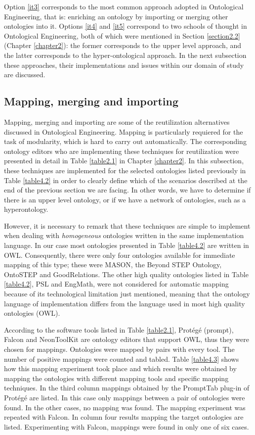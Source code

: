 Option \ref{it3} corresponds to the most common approach adopted in Ontological Engineering, that is: enriching an ontology by importing or merging other ontologies into it. Options \ref{it4} and \ref{it5} correspond to two schools of thought in Ontological Engineering, both of which were mentioned in Section \ref{section2.2} (Chapter \ref{chapter2}): the former corresponds to the upper level approach, and the latter corresponds to the hyper-ontological approach. In the next subsection these approaches, their implementations and issues within our domain of study are discussed.


\subsection{Mapping, merging and importing}\label{subsection4.2.4}

Mapping, merging and importing are some of the reutilization alternatives discussed in Ontological Engineering. \cbstart Mapping is particularly requiered for the task of modularity, which is hard to carry out automatically. \cbend The corresponding ontology editors who are implementing these techniques for reutilization were presented in detail in Table \ref{table2.1} in Chapter \ref{chapter2}. In this subsection, these techniques are implemented  for the selected ontologies listed previously in Table \ref{table4.2}  in order to clearly define which of the scenarios described at the end of the previous section we are facing. In other words, we have to determine if there is an upper level ontology, or if we have a network of ontologies, such as a hyperontology.

However, it is necessary to remark that these techniques are simple to implement when dealing with \textit{homogeneous} ontologies written in the same implementation language. In our case most ontologies presented in Table \ref{table4.2} are written in OWL. Consequently, there were only four ontologies available for immediate mapping of this type; these were MASON, the Beyond STEP Ontology, OntoSTEP and GoodRelations. The other high quality ontologies listed in Table \ref{table4.2}, PSL and EngMath, were not considered for automatic mapping because of its technological  limitation just mentioned, meaning that the ontology language of implementation differs from the language used in most high quality ontologies (OWL). 

According to the software tools listed in Table \ref{table2.1}, Protégé (prompt), Falcon and NeonToolKit are ontology editors that support OWL, thus they were chosen for mappings. Ontologies were mapped by pairs with every tool. The number of positive mappings were counted and tabled. Table \ref{table4.3} shows how this mapping experiment took place and which results were obtained by mapping the ontologies with different mapping tools and specific mapping techniques. In the third column mappings obtained by the PromptTab plug-in of Protégé are listed. In this case only mappings between a pair of ontologies were found. In the other cases, no mapping was found.  The mapping experiment was repeated with Falcon. In column four results mapping the target ontologies are listed. Experimenting with Falcon, mappings were found in only one of six cases. 

